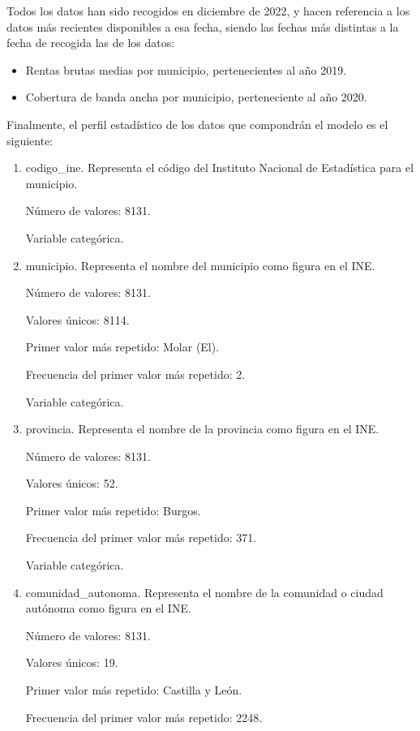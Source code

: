 Todos los datos han sido recogidos en diciembre de 2022, y hacen referencia a los datos más recientes disponibles a esa fecha, siendo las fechas más distintas a la fecha de recogida las de los datos:

\begin{itemize}
    \item Rentas brutas medias por municipio, pertenecientes al año 2019.
    \item Cobertura de banda ancha por municipio, perteneciente al año 2020.
\end{itemize}

Finalmente, el perfil estadístico de los datos que compondrán el modelo es el siguiente:

\begin{enumerate}
    	\item codigo\_ine. Representa el código del Instituto Nacional de Estadística para el municipio.
	
	Número de valores: 8131.
	
	Variable categórica.

	\item municipio. Representa el nombre del municipio como figura en el INE.
	
	Número de valores: 8131.
	
	Valores únicos: 8114.
	
	Primer valor más repetido: Molar (El).
	
	Frecuencia del primer valor más repetido: 2.
	
	Variable categórica.

	\item provincia. Representa el nombre de la provincia como figura en el INE.
	
	Número de valores: 8131.
	
	Valores únicos: 52.
	
	Primer valor más repetido: Burgos.
	
	Frecuencia del primer valor más repetido: 371.
	
	Variable categórica.

	\item comunidad\_autonoma. Representa el nombre de la comunidad o ciudad autónoma como figura en el INE.
	
	Número de valores: 8131.
	
	Valores únicos: 19.
	
	Primer valor más repetido: Castilla y León.
	
	Frecuencia del primer valor más repetido: 2248.
	

\end{enumerate}
